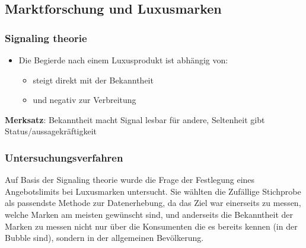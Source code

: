 \subsection{Marktforschung und Luxusmarken}

\subsubsection{Signaling theorie}
\begin{itemize}
    \item Die Begierde nach einem Luxusprodukt ist abhängig von:
    \begin{itemize}
        \item steigt direkt mit der Bekanntheit 
        \item und negativ zur Verbreitung 
    \end{itemize}
\end{itemize}

\textbf{Merksatz}: Bekanntheit macht Signal lesbar für andere, Seltenheit gibt Status/aussagekräftigkeit
\pagebreak
\subsubsection{Untersuchungsverfahren}
Auf Basis der Signaling theorie wurde die Frage der Festlegung eines Angebotslimits bei Luxusmarken untersucht. 
Sie wählten die Zufällige Stichprobe als passendste Methode zur Datenerhebung, da das Ziel war einerseits zu messen, welche Marken am meisten gewünscht sind,
und anderseits die Bekanntheit der Marken zu messen nicht nur über die Konsumenten die es bereits kennen (in der Bubble sind), sondern in der allgemeinen Bevölkerung.